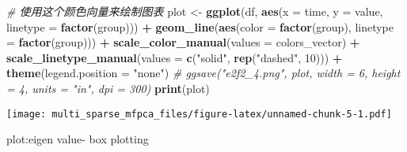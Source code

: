 \documentclass[
]{article}
\newenvironment{Shaded}{\begin{snugshade}}{\end{snugshade}}
\newcommand{\AttributeTok}[1]{\textcolor[rgb]{0.13,0.29,0.53}{#1}}
\newcommand{\CommentTok}[1]{\textcolor[rgb]{0.56,0.35,0.01}{\textit{#1}}}
\newcommand{\DecValTok}[1]{\textcolor[rgb]{0.00,0.00,0.81}{#1}}
\newcommand{\FunctionTok}[1]{\textcolor[rgb]{0.13,0.29,0.53}{\textbf{#1}}}
\newcommand{\NormalTok}[1]{#1}
\newcommand{\OtherTok}[1]{\textcolor[rgb]{0.56,0.35,0.01}{#1}}
\newcommand{\SpecialCharTok}[1]{\textcolor[rgb]{0.81,0.36,0.00}{\textbf{#1}}}
\newcommand{\StringTok}[1]{\textcolor[rgb]{0.31,0.60,0.02}{#1}}
\begin{document}
\begin{Shaded}
\begin{Highlighting}[]
 \CommentTok{\# 使用这个颜色向量来绘制图表  }
\NormalTok{ plot }\OtherTok{\textless{}{-}} \FunctionTok{ggplot}\NormalTok{(df, }\FunctionTok{aes}\NormalTok{(}\AttributeTok{x =}\NormalTok{ time, }\AttributeTok{y =}\NormalTok{ value, }\AttributeTok{linetype =} \FunctionTok{factor}\NormalTok{(group))) }\SpecialCharTok{+}      
     \FunctionTok{geom\_line}\NormalTok{(}\FunctionTok{aes}\NormalTok{(}\AttributeTok{color =} \FunctionTok{factor}\NormalTok{(group), }\AttributeTok{linetype =} \FunctionTok{factor}\NormalTok{(group))) }\SpecialCharTok{+}    
     \FunctionTok{scale\_color\_manual}\NormalTok{(}\AttributeTok{values =}\NormalTok{ colors\_vector) }\SpecialCharTok{+}    
     \FunctionTok{scale\_linetype\_manual}\NormalTok{(}\AttributeTok{values =} \FunctionTok{c}\NormalTok{(}\StringTok{"solid"}\NormalTok{, }\FunctionTok{rep}\NormalTok{(}\StringTok{"dashed"}\NormalTok{, }\DecValTok{10}\NormalTok{))) }\SpecialCharTok{+}  
     \FunctionTok{theme}\NormalTok{(}\AttributeTok{legend.position =} \StringTok{"none"}\NormalTok{)  }
\CommentTok{\# ggsave("e2f2\_4.png", plot, width = 6, height = 4, units = "in", dpi = 300)}
\FunctionTok{print}\NormalTok{(plot)}
\end{Highlighting}
\end{Shaded}

\texttt{[image: multi\_sparse\_mfpca\_files/figure-latex/unnamed-chunk-5-1.pdf]}

plot:eigen value- box plotting
\end{document}
